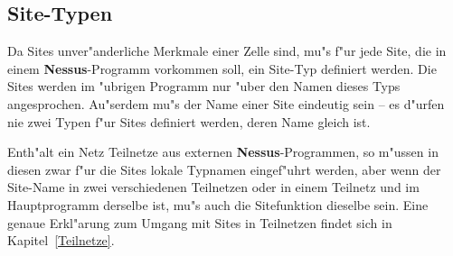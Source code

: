 \begin{center}
\end{center}

\subsection{Site-Typen}
\label{Sites}

Da Sites unver"anderliche Merkmale einer Zelle sind, mu"s f"ur jede
Site, die in einem {\bf Nessus}-Programm vorkommen soll, ein Site-Typ
definiert werden. Die Sites werden im "ubrigen Programm nur "uber den
Namen dieses Typs angesprochen. Au"serdem mu"s der Name einer Site
eindeutig sein -- es d"urfen nie zwei Typen f"ur Sites definiert
werden, deren Name gleich ist.

Enth"alt ein Netz Teilnetze  
 aus externen {\bf Nessus}-Programmen, so
m"ussen in diesen zwar f"ur die Sites lokale Typnamen eingef"uhrt
werden, aber wenn der Site-Name in zwei verschiedenen
Teilnetzen oder in einem Teilnetz und
im Hauptprogramm derselbe ist, mu"s auch die Sitefunktion dieselbe
sein. Eine genaue Erkl"arung zum Umgang mit Sites in
Teilnetzen findet sich in
Kapitel~\ref{Teilnetze}.

\begin{center}
\end{center}

